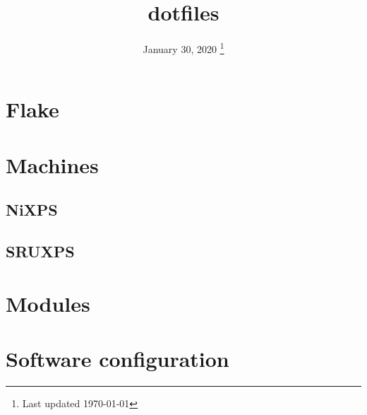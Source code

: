 \documentclass[a4paper,nobib,titlepage,xelatex]{tufte-book}
\title{dotfiles}
\date{%
  January 30, 2020
  \thanks{Last updated \today}
}
\begin{document}
\frontmatter
\maketitle
\tableofcontents
\mainmatter

\newpage

\chapter{Flake}


\chapter{Machines}
\section{NiXPS}


\section{SRUXPS}



\chapter{Modules}









\chapter{Software configuration}






















\backmatter

\end{document}
